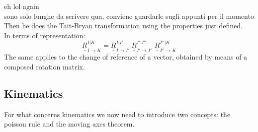 \begin{enumerate}
    eh lol again\\
    {\color{red}sono solo lunghe da scrivere qua, conviene guardarle sugli appunti per il momento}
    Then he does the Tait-Bryan transformation using the properties just defined.
    \\
    In terms of representation:
    \begin{equation}
        \underline{\underline{R}}_{I\to K}^{I|K} = \underline{\underline{R}}_{I\to I'}^{I|I'} ~\underline{\underline{R}}_{I'\to I''}^{I'|I''} ~\underline{\underline{R}}_{I''\to K}^{I''|K} 
    \end{equation}
    The same applies to the change of reference of a vector, obtained by means of a composed rotation matrix.
\end{enumerate}

\subsection{Kinematics}
For what concerns kinematics we now need to introduce two concepts: the poisson rule and the moving axes theorem.

